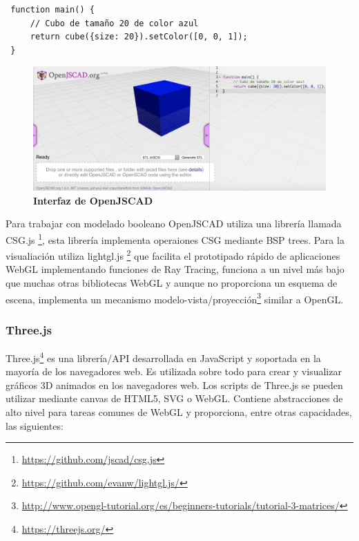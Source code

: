 \begin{verbatim}
 function main() {
     // Cubo de tamaño 20 de color azul
     return cube({size: 20}).setColor([0, 0, 1]);
 }
\end{verbatim}

\begin{figure}[h]
\includegraphics[width=15cm]{Img/WEB/web-jopen.jpg}
\centering
\caption{\textbf{\footnotesize{Interfaz de OpenJSCAD }}}
\label{fig:jopen}
\end{figure}


Para trabajar con modelado booleano OpenJSCAD utiliza una librería llamada CSG.js \footnote{\url{https://github.com/jscad/csg.js}}, esta librería implementa operaiones CSG mediante BSP trees. Para la visualiación utiliza lightgl.js \footnote{\url{https://github.com/evanw/lightgl.js/}} que facilita el prototipado rápido de aplicaciones WebGL implementando funciones de Ray Tracing, funciona a un nivel más bajo que muchas otras bibliotecas WebGL y aunque no proporciona un esquema de escena, implementa un mecanismo modelo-vista/proyección\footnote{\url{http://www.opengl-tutorial.org/es/beginners-tutorials/tutorial-3-matrices/}} similar a OpenGL.

\subsubsection{Three.js
}

Three.js\footnote{\url{https://threejs.org/}} es una librería/API desarrollada en JavaScript y soportada en la mayoría de los navegadores web. Es utilizada sobre todo para crear y visualizar gráficos 3D animados en los navegadores web. Los scripts de Three.js se pueden utilizar mediante canvas de HTML5, SVG o WebGL. Contiene abstracciones de alto nivel para tareas comunes de WebGL y proporciona, entre otras capacidades, las siguientes:

